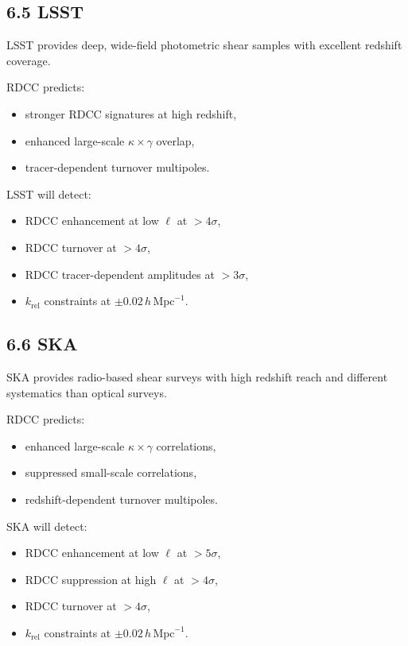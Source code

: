 \documentclass[11pt,a4paper]{article}
\begin{document}
\subsection*{6.5 LSST}

LSST provides deep, wide-field photometric shear samples with excellent redshift coverage.

RDCC predicts:

\begin{itemize}
    \item stronger RDCC signatures at high redshift,
    \item enhanced large-scale $\kappa \times \gamma$ overlap,
    \item tracer-dependent turnover multipoles.
\end{itemize}

LSST will detect:

\begin{itemize}
    \item RDCC enhancement at low $\ell$ at $>4\sigma$,
    \item RDCC turnover at $>4\sigma$,
    \item RDCC tracer-dependent amplitudes at $>3\sigma$,
    \item $k_{\mathrm{rel}}$ constraints at $\pm 0.02\,h\,\mathrm{Mpc}^{-1}$.
\end{itemize}

\subsection*{6.6 SKA}

SKA provides radio-based shear surveys with high redshift reach and different systematics 
than optical surveys.

RDCC predicts:

\begin{itemize}
    \item enhanced large-scale $\kappa \times \gamma$ correlations,
    \item suppressed small-scale correlations,
    \item redshift-dependent turnover multipoles.
\end{itemize}

SKA will detect:

\begin{itemize}
    \item RDCC enhancement at low $\ell$ at $>5\sigma$,
    \item RDCC suppression at high $\ell$ at $>4\sigma$,
    \item RDCC turnover at $>4\sigma$,
    \item $k_{\mathrm{rel}}$ constraints at $\pm 0.02\,h\,\mathrm{Mpc}^{-1}$.
\end{itemize}
\end{document}
